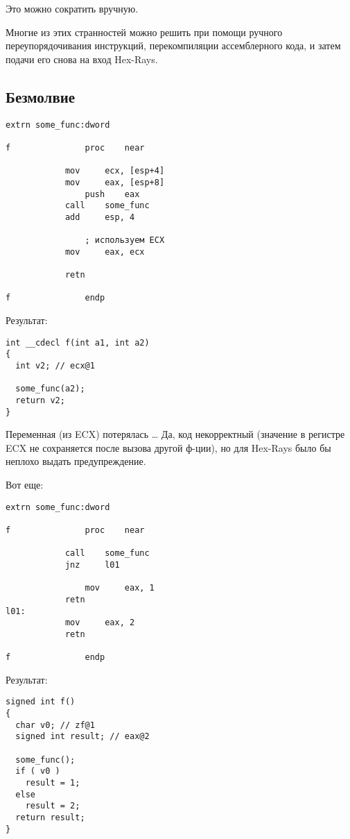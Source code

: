 Это можно сократить вручную.

Многие из этих странностей можно решить при помощи ручного переупорядочивания инструкций, перекомпиляции ассемблерного кода,
и затем подачи его снова на вход Hex-Rays.

\subsection{Безмолвие}

\begin{lstlisting}
extrn some_func:dword

f               proc    near

        	mov     ecx, [esp+4]
	        mov     eax, [esp+8]
                push    eax
        	call    some_func
	        add     esp, 4

                ; используем ECX
        	mov     eax, ecx

	        retn

f               endp
\end{lstlisting}

Результат:

\begin{lstlisting}
int __cdecl f(int a1, int a2)
{
  int v2; // ecx@1

  some_func(a2);
  return v2;
}
\end{lstlisting}

Переменная  (из ECX) потерялась \dots
Да, код некорректный (значение в регистре ECX не сохраняется после вызова другой ф-ции),
но для Hex-Rays было бы неплохо выдать предупреждение.

Вот еще:

\begin{lstlisting}
extrn some_func:dword

f               proc    near

	        call    some_func
        	jnz     l01

                mov     eax, 1
	        retn
l01:
	        mov     eax, 2
        	retn

f               endp
\end{lstlisting}

Результат:

\begin{lstlisting}
signed int f()
{
  char v0; // zf@1
  signed int result; // eax@2

  some_func();
  if ( v0 )
    result = 1;
  else
    result = 2;
  return result;
}
\end{lstlisting}

